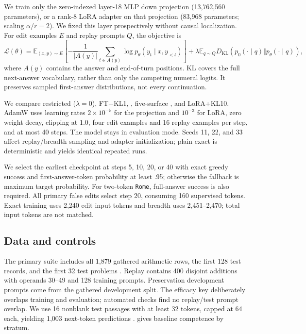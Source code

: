 We train only the zero-indexed layer-18 MLP down projection (13,762,560 parameters), or a rank-8 LoRA adapter on that projection (83,968 parameters; scaling $\alpha/r=2$). We fixed this layer prospectively without causal localization. For edit examples $E$ and replay prompts $Q$, the objective is
\begin{equation}
 \mathcal{L}(\theta)=\mathbb{E}_{(x,y)\sim E}\left[-\frac{1}{|A(y)|}\sum_{t\in A(y)}\log p_\theta(y_t\mid x,y_{<t})\right]
 +\lambda\mathbb{E}_{q\sim Q}D_{\mathrm{KL}}\!\left(p_0(\cdot\mid q)\Vert p_\theta(\cdot\mid q)\right),
\end{equation}
where $A(y)$ contains the answer and end-of-turn positions. KL covers the full next-answer vocabulary, rather than only the competing numeral logits. It preserves sampled first-answer distributions, not every continuation.

We compare restricted \ft ($\lambda=0$), FT+KL1, \klten, five-surface \breadth, and LoRA+KL10. AdamW uses learning rates $2\times10^{-5}$ for the projection and $10^{-3}$ for LoRA, zero weight decay, clipping at 1.0, four edit examples and 16 replay examples per step, and at most 40 steps. The model stays in evaluation mode. Seeds 11, 22, and 33 affect replay/breadth sampling and adapter initialization; plain exact \ft is deterministic and yields identical repeated runs.

We select the earliest checkpoint at steps 5, 10, 20, or 40 with exact greedy success and first-answer-token probability at least .95; otherwise the fallback is maximum target probability. For two-token \texttt{Rome}, full-answer success is also required. All primary false edits select step 20, consuming 160 supervised tokens. Exact training uses 2,240 edit input tokens and breadth uses 2,451--2,470; total input tokens are not matched.

\subsection{Data and controls}
The primary suite includes all 1,879 gathered arithmetic rows, the first 128 \cfact test records, and the first 32 \gsm test problems \cite{counterfactdata,gsmdata}. Replay contains 400 disjoint additions with operands 30--49 and 128 \cfact training prompts. Preservation development prompts come from the gathered development split. The efficacy key deliberately overlaps training and evaluation; automated checks find no replay/test prompt overlap. We use 16 nonblank \wikitext test passages with at least 32 tokens, capped at 64 each, yielding 1,003 next-token predictions \cite{wikitextdata}.  gives baseline competence by stratum.

